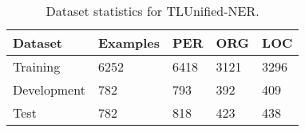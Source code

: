 \documentclass[../report.tex]{subfiles}
\begin{document}
\begin{table}[t]
\begin{tabular}{@{}lllll@{}}
\toprule
Dataset     & Examples & PER  & ORG  & LOC  \\ \midrule
Training    & 6252     & 6418 & 3121 & 3296 \\
Development & 782      & 793  & 392  & 409  \\
Test        & 782      & 818  & 423  & 438  \\ \bottomrule
\end{tabular}
\caption{Dataset statistics for TLUnified-NER.}
\label{table:dset_stats}
\end{table}
\end{document}

